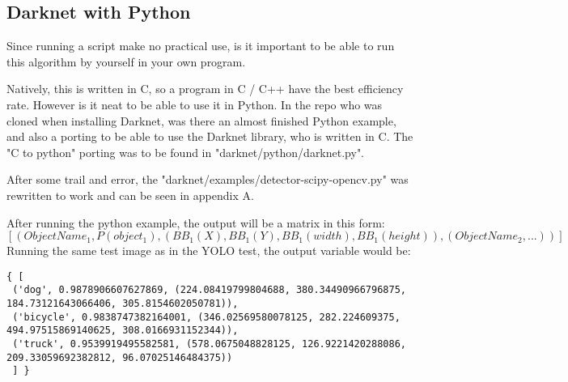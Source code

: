 \subsection{Darknet with Python}
Since running a script make no practical use, is it important to be able to run this algorithm by yourself in your own program.

Natively, this is written in C, so a program in C / C++ have the best efficiency rate. However is it neat to be able to use it in Python. In the repo who was cloned when installing Darknet, was there an almost finished Python example, and also a porting to be able to use the Darknet library, who is written in C. The "C to python" porting was to be found in "darknet/python/darknet.py".

After some trail and error, the "darknet/examples/detector-scipy-opencv.py" was rewritten to work and can be seen in appendix A.

After running the python example, the output will be a matrix in this form:
 \[
 {[ (Object Name_1,P(object_1), (BB_1(X), BB_1(Y),BB_1(width),BB_1(height)),(Object Name_2, ... )  )]}
 \]
 \newpage
 Running the same test image as in the YOLO test, the output variable would be:
\begin{lstlisting}[frame=single]  
 { [
 ('dog', 0.9878906607627869, (224.08419799804688, 380.34490966796875, 184.73121643066406, 305.8154602050781)), 
 ('bicycle', 0.9838747382164001, (346.02569580078125, 282.224609375, 494.97515869140625, 308.0166931152344)), 
 ('truck', 0.9539919495582581, (578.0675048828125, 126.9221420288086, 209.33059692382812, 96.07025146484375))
 ] } 
 \end{lstlisting}
